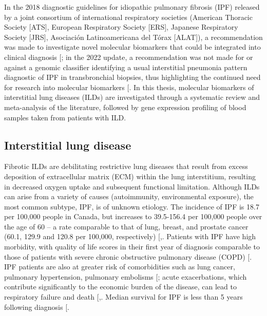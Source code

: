 \documentclass[
]{article}
\begin{document}
In the 2018 diagnostic guidelines for idiopathic pulmonary fibrosis (IPF) released by a joint consortium of international respiratory societies (American Thoracic Society {[}ATS{]}, European Respiratory Society {[}ERS{]}, Japanese Respiratory Society {[}JRS{]}, Asociación Latinoamericana del Tórax {[}ALAT{]}), a recommendation was made to investigate novel molecular biomarkers that could be integrated into clinical diagnosis {[}\citeproc{ref-raghu_diagnosis_2018}{1}{]}; in the 2022 update, a recommendation was not made for or against a genomic classifier identifying a usual interstitial pneumonia pattern diagnostic of IPF in transbronchial biopsies, thus highlighting the continued need for research into molecular biomarkers {[}\citeproc{ref-raghu_idiopathic_2022}{2}{]}. In this thesis, molecular biomarkers of interstitial lung diseases (ILDs) are investigated through a systematic review and meta-analysis of the literature, followed by gene expression profiling of blood samples taken from patients with ILD.

\subsection{Interstitial lung disease}\label{interstitial-lung-disease}

Fibrotic ILDs are debilitating restrictive lung diseases that result from excess deposition of extracellular matrix (ECM) within the lung interstitium, resulting in decreased oxygen uptake and subsequent functional limitation. Although ILDs can arise from a variety of causes (autoimmunity, environmental exposure), the most common subtype, IPF, is of unknown etiology. The incidence of IPF is 18.7 per 100,000 people in Canada, but increases to 39.5-156.4 per 100,000 people over the age of 60 -- a rate comparable to that of lung, breast, and prostate cancer (60.1, 129.9 and 120.8 per 100,000, respectively) {[},\citeproc{ref-canadian_cancer_statistics_advisory_committee_in_collaboration_with_the_canadian_cancer_society_statistics_canada_and_the_public_health_agency_of_canada_canadian_2023}{4}{]}. Patients with IPF have high morbidity, with quality of life scores in their first year of diagnosis comparable to those of patients with severe chronic obstructive pulmonary disease (COPD) {[}\citeproc{ref-hopkins_epidemiology_2016}{3}{]}. IPF patients are also at greater risk of comorbidities such as lung cancer, pulmonary hypertension, pulmonary embolisms {[}\citeproc{ref-raghu_comorbidities_2015}{5}{]}; acute exacerbations, which contribute significantly to the economic burden of the disease, can lead to respiratory failure and death {[},\citeproc{ref-hilberg_economic_2018}{7}{]}. Median survival for IPF is less than 5 years following diagnosis {[}\citeproc{ref-ley_clinical_2011}{8}{]}.
\end{document}
